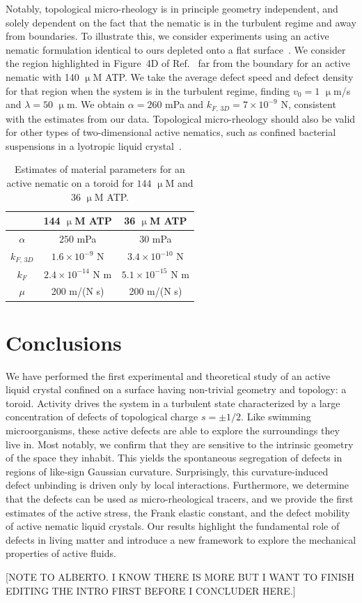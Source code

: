 Notably, topological micro-rheology is in principle geometry independent, and solely dependent on the fact that the nematic is in the turbulent regime and away from boundaries.
To illustrate this, we consider experiments using an active nematic formulation identical to ours depleted onto a flat surface~\cite{RN134}. We consider the region highlighted in Figure~4D of Ref.~\cite{RN134} far from the boundary for an active nematic with 140 $\upmu$M ATP.
We take the average defect speed and defect density for that region when the system is in the turbulent regime, finding $v_0 = 1$ $\upmu$m/s and $\lambda = 50$ $\upmu$m.
We obtain $\alpha = 260$ mPa and $k_{F,\, 3D} = 7 \times 10^{-9}$ N, consistent with the estimates from our data.
Topological micro-rheology should also be valid for other types of two-dimensional active nematics, such as confined bacterial suspensions in a lyotropic liquid crystal~\cite{RN86}.
\begin{table}
  \centering
  \caption{Estimates of material parameters for an active nematic on a toroid for $144$ $\upmu$M and 36 $\upmu$M ATP.}
  \begin{tabular}{|c|c c|}
    \hline
     & 144 $\upmu$M ATP & 36 $\upmu$M ATP \\
     \hline
     $\alpha$ &  $250$ mPa & $30$ mPa \\
     $k_{F,\, 3D}$ & $1.6 \times 10^{-9}$ N & $3.4 \times 10^{-10}$ N \\
     $k_F$ & $2.4 \times 10^{-14}$ N m & $5.1 \times 10^{-15}$ N m \\
     $\mu$ & 200 m/(N s) & 200 m/(N s) \\
     \hline
  \end{tabular}\label{t:3-MaterialParams}
\end{table}



\section{Conclusions}
We have performed the first experimental and theoretical study of an active liquid crystal confined on a surface having non-trivial geometry and topology: a toroid.
Activity drives the system in a turbulent state characterized by a large concentration of defects of topological charge $s = \pm 1/2$.
Like swimming microorganisms, these active defects are able to explore the surroundings they live in.
Most notably, we confirm that they are sensitive to the intrinsic geometry of the space they inhabit.
This yields the spontaneous segregation of defects in regions of like-sign Gaussian curvature.
Surprisingly, this curvature-induced defect unbinding is driven only by local interactions.
Furthermore, we determine that the defects can be used as micro-rheological tracers, and we provide the first estimates of the active stress, the Frank elastic constant, and the defect mobility of active nematic liquid crystals.
Our results highlight the fundamental role of defects in living matter and introduce a new framework to explore the mechanical properties of active fluids.

[NOTE TO ALBERTO. I KNOW THERE IS MORE BUT I WANT TO FINISH EDITING THE INTRO FIRST BEFORE I CONCLUDER HERE.]
